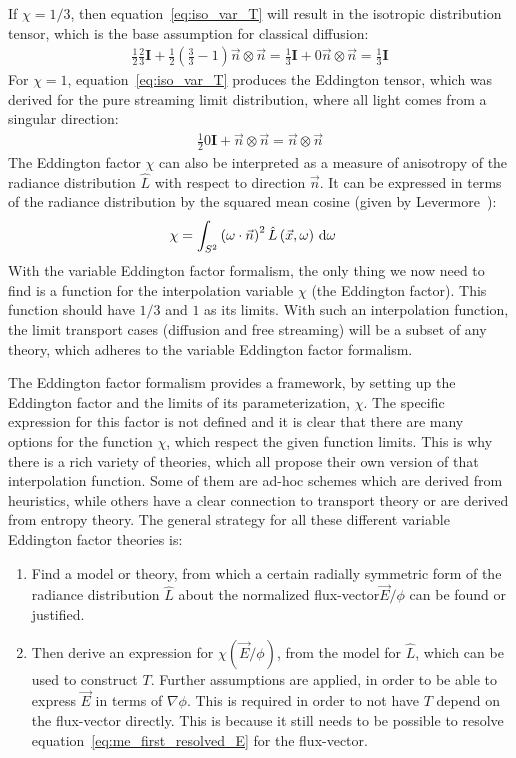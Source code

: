 If $\chi=1/3$, then equation~\ref{eq:iso_var_T} will result in the isotropic distribution tensor, which is the base assumption for classical diffusion:
\begin{align}
\frac{1}{2}\frac{2}{3}\mathbf{I} + \frac{1}{2}\left(\frac{3}{3}-1\right) \vec{n}\otimes\vec{n}
=\frac{1}{3}\mathbf{I} + 0\vec{n}\otimes\vec{n} = \frac{1}{3}\mathbf{I}
\end{align}
For $\chi=1$, equation~\ref{eq:iso_var_T} produces the Eddington tensor, which was derived for the pure streaming limit distribution, where all light comes from a singular direction:
\begin{align}
\frac{1}{2}0\mathbf{I} + \vec{n}\otimes\vec{n}
= \vec{n}\otimes\vec{n}
\end{align}
The Eddington factor $\chi$ can also be interpreted as a measure of anisotropy of the radiance distribution $\widehat{L}$ with respect to direction $\vec{n}$. It can be expressed in terms of the radiance distribution by the squared mean cosine (given by Levermore~\cite{Levermore84}):
\begin{align}
\chi &= \int_{S^2}{ \left(\omega\cdot\vec{n}\right)^2\hat{L}\left(\vec{x}, \omega\right)\,\mathrm{d}\omega}
\label{eq:iso_var_chi}
\end{align}
With the variable Eddington factor formalism, the only thing we now need to find is a function for the interpolation variable $\chi$ (the Eddington factor). This function should have $1/3$ and $1$ as its limits. With such an interpolation function, the limit transport cases (diffusion and free streaming) will be a subset of any theory, which adheres to the variable Eddington factor formalism.

The Eddington factor formalism provides a framework, by setting up the Eddington factor and the limits of its parameterization, $\chi$. The specific expression for this factor is not defined and it is clear that there are many options for the function $\chi$, which respect the given function limits. This is why there is a rich variety of theories, which all propose their own version of that interpolation function. Some of them are ad-hoc schemes which are derived from heuristics, while others have a clear connection to transport theory or are derived from entropy theory.
The general strategy for all these different variable Eddington factor theories is:
\begin{enumerate}
\item Find a model or theory, from which a certain radially symmetric form of the radiance distribution $\hat{L}$ about the normalized flux-vector$\vec{E}/\phi$ can be found or justified.
\item Then derive an expression for $\chi(\vec{E}/\phi)$, from the model for $\hat{L}$, which can be used to construct $T$. Further assumptions are applied, in order to be able to express $\vec{E}$ in terms of $\nabla\phi$. This is required in order to not have $T$ depend on the flux-vector directly. This is because it still needs to be possible to resolve equation~\ref{eq:me_first_resolved_E} for the flux-vector.
\end{enumerate}

